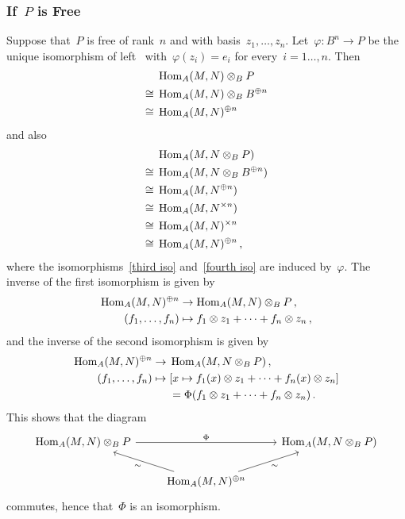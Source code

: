 \subsubsection{If~$P$ is Free}

Suppose that~$P$ is free of rank~$n$ and with basis~$z_1, \dotsc, z_n$.
Let~$\varphi \colon B^n \to P$ be the unique isomorphism of left~{} with~$\varphi(z_i) = e_i$ for every~$i = 1 \dotsc, n$.
Then
\begin{align}
       {}&  \operatorname{Hom}_A(M, N) \otimes_B P  \notag  \\
  \cong{}&  \operatorname{Hom}_A(M, N) \otimes_B B^{\oplus n} \label{third iso} \\
  \cong{}&  \operatorname{Hom}_A(M, N)^{\oplus n} \notag
\end{align}
and also
\begin{align}
       {}&  \operatorname{Hom}_A(M, N \otimes_B P)  \notag  \\
  \cong{}&  \operatorname{Hom}_A(M, N \otimes_B B^{\oplus n}) \label{fourth iso}  \\
  \cong{}&  \operatorname{Hom}_A(M, N^{\oplus n}) \notag  \\
  \cong{}&  \operatorname{Hom}_A(M, N^{\times n}) \notag  \\
  \cong{}&  \operatorname{Hom}_A(M, N)^{\times n}  \notag  \\
  \cong{}&  \operatorname{Hom}_A(M, N)^{\oplus n} \notag  \,,
\end{align}
where the isomorphisms~\eqref{third iso} and~\eqref{fourth iso} are induced by~$\varphi$.
The inverse of the first isomorphism is given by
\begin{align*}
            \operatorname{Hom}_A(M,N)^{\oplus n}
  &\to      \operatorname{Hom}_A(M,N) \otimes_B P \,,
  \\
            (f_1, \dotsc, f_n)
  &\mapsto  f_1 \otimes z_1 + \dotsb + f_n \otimes z_n \,,
\end{align*}
and the inverse of the second isomorphism is given by
\begin{align*}
              \operatorname{Hom}_A(M,N)^{\oplus n}
  \to{}&      \operatorname{Hom}_A(M, N \otimes_B P) \,,
  \\
              (f_1, \dotsc, f_n)
  \mapsto{}&  [x \mapsto f_1(x) \otimes z_1 + \dotsb + f_n(x) \otimes z_n]
  \\
              {}
  &=          \Phi( f_1 \otimes z_1 + \dotsb + f_n \otimes z_n ) \,.
\end{align*}
This shows that the diagram
\[
  \begin{tikzcd}
      \Hom_A(M, N) \tensor_B P
      \arrow{rr}[above]{\Phi}
    & {}
    & \Hom_A(M, N \tensor_B P)
    \\
      {}
    & \Hom_A(M, N)^{\oplus n}
      \arrow{ul}[below left]{\sim}
      \arrow{ur}[below right]{\sim}
    & {}
  \end{tikzcd}
\]
commutes, hence that~$\Phi$ is an isomorphism.




